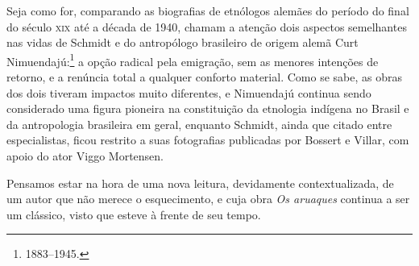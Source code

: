 Seja como for, comparando as biografias de etnólogos alemães do período
do final do século \textsc{xix} até a década de 1940, chamam a atenção dois
aspectos semelhantes nas vidas de Schmidt e do antropólogo brasileiro de
origem alemã Curt Nimuendajú:\footnote{1883--1945.} a opção radical pela
emigração, sem as menores intenções de retorno, e a renúncia total a
qualquer conforto material. Como se sabe, as obras dos dois tiveram
impactos muito diferentes, e Nimuendajú continua sendo considerado uma
figura pioneira na constituição da etnologia indígena no Brasil e da
antropologia brasileira em geral, enquanto Schmidt, ainda que citado entre especialistas, 
ficou restrito a suas fotografias publicadas por Bossert e Villar, com apoio do ator Viggo
Mortensen.

Pensamos estar na hora de uma nova leitura, devidamente
contextualizada, de um autor que não merece o esquecimento, e cuja
obra \textit{Os aruaques} continua a ser um clássico, visto que esteve à
frente de seu tempo.








